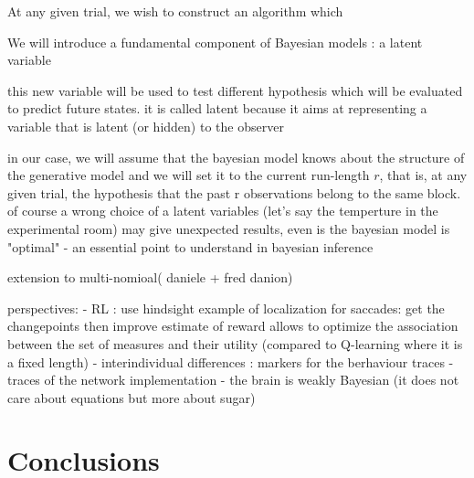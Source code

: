 \documentclass[profile,final,english,draft]{article}%
\newcommand{\citep}[1]{\parencite{#1}}
\begin{document}
At any given trial, we wish to construct an algorithm which

We will introduce a fundamental component of Bayesian models : a latent variable

this new variable will be used to test different hypothesis which will be evaluated to predict future states. it is called latent because it aims at representing a variable that is latent (or hidden) to the observer

in our case, we will assume that the bayesian model knows about the structure of the generative model and we will set it to the current run-length $r$, that is, at any given trial, the hypothesis that the past r observations belong to the same block. of course a wrong choice of a latent variables (let's say the temperture in the experimental room) may give unexpected results, even is the bayesian model is "optimal" - an essential point to understand in bayesian inference

extension to multi-nomioal( daniele + fred danion)





perspectives:
- RL : use hindsight example of localization for saccades: get the changepoints then improve estimate of reward allows to optimize the association between the set of measures and their utility (compared to Q-learning where it is a fixed length)
- interindividual differences : markers for the berhaviour traces - traces of the network implementation
- the brain is weakly Bayesian (it does not care about equations but more about sugar)



\section{Conclusions}
\end{document}
